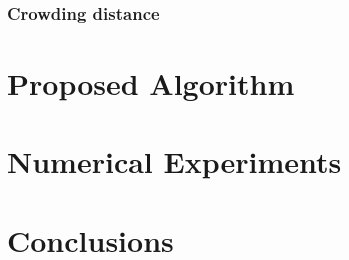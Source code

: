 \documentclass{IEEEtran}
\begin{document}
\subsubsection{Crowding distance}


\section{Proposed Algorithm}

\section{Numerical Experiments}

\section{Conclusions}
	
	
	
	
	
	



	
	
	
	
	
\end{document}
